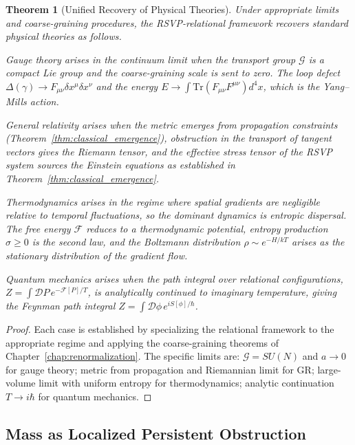 \documentclass[12pt,a4paper,openany]{book}
\theoremstyle{plain}
\newtheorem{theorem}{Theorem}[chapter]
\theoremstyle{definition}
\theoremstyle{remark}
\begin{document}
\begin{theorem}[Unified Recovery of Physical Theories]
\label{thm:full_unification}
Under appropriate limits and coarse-graining procedures, the RSVP-relational framework recovers standard physical theories as follows.

Gauge theory arises in the continuum limit when the transport group $\mathcal{G}$ is a compact Lie group and the coarse-graining scale is sent to zero. The loop defect $\Delta(\gamma) \to F_{\mu\nu}\delta x^\mu\delta x^\nu$ and the energy $E \to \int\mathrm{Tr}(F_{\mu\nu}F^{\mu\nu})d^4x$, which is the Yang--Mills action.

General relativity arises when the metric emerges from propagation constraints (Theorem~\ref{thm:classical_emergence}), obstruction in the transport of tangent vectors gives the Riemann tensor, and the effective stress tensor of the RSVP system sources the Einstein equations as established in Theorem~\ref{thm:classical_emergence}.

Thermodynamics arises in the regime where spatial gradients are negligible relative to temporal fluctuations, so the dominant dynamics is entropic dispersal. The free energy $\mathcal{F}$ reduces to a thermodynamic potential, entropy production $\sigma \geq 0$ is the second law, and the Boltzmann distribution $\rho \sim e^{-H/kT}$ arises as the stationary distribution of the gradient flow.

Quantum mechanics arises when the path integral over relational configurations, $Z = \int\mathcal{D}P\,e^{-\mathcal{F}[P]/T}$, is analytically continued to imaginary temperature, giving the Feynman path integral $Z = \int\mathcal{D}\phi\,e^{iS[\phi]/\hbar}$.
\end{theorem}

\begin{proof}
Each case is established by specializing the relational framework to the appropriate regime and applying the coarse-graining theorems of Chapter~\ref{chap:renormalization}. The specific limits are: $\mathcal{G} = SU(N)$ and $a \to 0$ for gauge theory; metric from propagation and Riemannian limit for GR; large-volume limit with uniform entropy for thermodynamics; analytic continuation $T \to i\hbar$ for quantum mechanics.
\end{proof}

\subsection{Mass as Localized Persistent Obstruction}
\end{document}

